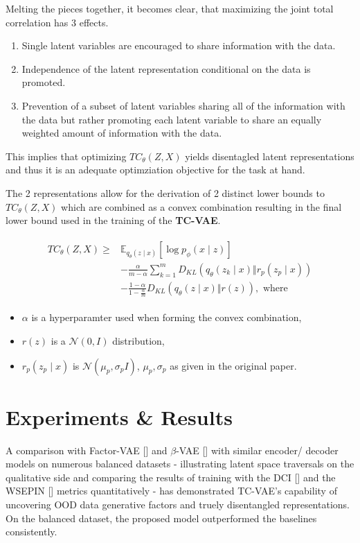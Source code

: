\documentclass[twoside,11pt]{article}
\begin{document}
Melting the pieces together, it becomes clear, that maximizing the joint total correlation has 3 effects.
\begin{enumerate}
  \item Single latent variables are encouraged to share information with the data.
  \item Independence of the latent representation conditional on the data is promoted.
  \item Prevention of a subset of latent variables sharing all of the information with the data but rather promoting each latent variable to share an equally weighted amount of information with the data.
\end{enumerate}
This implies that optimizing $TC_{\theta}(Z,X)$ yields disentagled latent representations and thus it is an adequate optimziation objective for the task at hand.

The 2 representations allow for the derivation of 2 distinct lower bounds to $TC_{\theta}(Z, X)$ which are combined as a convex combination resulting in the final lower bound used in the training of the \textbf{TC-VAE}.

\begin{definition}
  \begin{align*}
    \begin{split}
      TC_{\theta}(Z, X) \geq & \mathbb{E}_{q_{\theta}(z \mid x)}[\log p_{\phi}(x \mid z)] \\
      & - \frac{\alpha}{m - \alpha} \sum_{k=1}^{m}D_{KL}(q_{\theta}(z_{k} \mid x) \Vert r_{p}(z_{p} \mid x)) \\
      & - \frac{1 - \alpha}{1 - \frac{\alpha}{m}} D_{KL}(q_{\theta}(z \mid x) \Vert r(z)), \text{ where }
    \end{split}
  \end{align*}
  \begin{itemize}
    \item $\alpha$ is a hyperparamter used when forming the convex combination,
    \item  $r(z)$ is a $\mathcal{N}(0, I)$ distribution,
    \item $r_{p}(z_{p} \mid x)$ is  $\mathcal{N}(\mu_{p}, \sigma_{p}I)$, $\mu_{p}, \sigma_{p}$ as given in the original paper.
  \end{itemize}
\end{definition}


\section{Experiments \& Results}
A comparison with Factor-VAE [\cite{FactorVAE}] and $\beta$-VAE [\cite{betaVAE}] with similar encoder/ decoder models on numerous balanced datasets - illustrating latent space traversals on the qualitative side and comparing the results of training with the DCI [\cite{DCI}] and the WSEPIN [\cite{WSEPIN}] metrics quantitatively - has demonstrated TC-VAE's capability of uncovering OOD data generative factors and truely disentangled representations. On the balanced dataset, the proposed model outperformed the baselines consistently.
\end{document}
